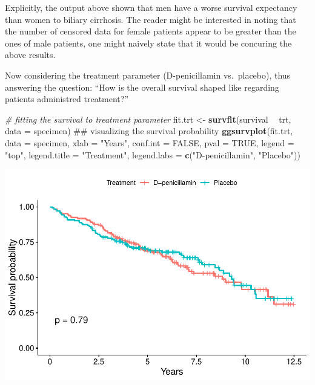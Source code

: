 \documentclass[]{article}
\newenvironment{Shaded}{\begin{snugshade}}{\end{snugshade}}
\newcommand{\KeywordTok}[1]{\textcolor[rgb]{0.13,0.29,0.53}{\textbf{#1}}}
\newcommand{\DataTypeTok}[1]{\textcolor[rgb]{0.13,0.29,0.53}{#1}}
\newcommand{\StringTok}[1]{\textcolor[rgb]{0.31,0.60,0.02}{#1}}
\newcommand{\CommentTok}[1]{\textcolor[rgb]{0.56,0.35,0.01}{\textit{#1}}}
\newcommand{\OtherTok}[1]{\textcolor[rgb]{0.56,0.35,0.01}{#1}}
\newcommand{\OperatorTok}[1]{\textcolor[rgb]{0.81,0.36,0.00}{\textbf{#1}}}
\newcommand{\NormalTok}[1]{#1}
\begin{document}
Explicitly, the output above shown that men have a worse survival
expectancy than women to biliary cirrhosis. The reader might be
interested in noting that the number of censored data for female
patients appear to be greater than the ones of male patients, one might
naively state that it would be concuring the above results.

Now considering the treatment parameter (D-penicillamin vs.~placebo),
thus answering the question: ``How is the overall survival shaped like
regarding patients administred treatment?''

\begin{Shaded}
\begin{Highlighting}[]
\CommentTok{# fitting the survival to treatment parameter}
\NormalTok{fit.trt <-}\StringTok{ }\KeywordTok{survfit}\NormalTok{(survival }\OperatorTok{~}\StringTok{ }\NormalTok{trt, }\DataTypeTok{data =}\NormalTok{ specimen)}
\NormalTok{## visualizing the survival probability}
\KeywordTok{ggsurvplot}\NormalTok{(fit.trt, }
           \DataTypeTok{data =}\NormalTok{ specimen, }
           \DataTypeTok{xlab =} \StringTok{"Years"}\NormalTok{,}
           \DataTypeTok{conf.int =} \OtherTok{FALSE}\NormalTok{,}
           \DataTypeTok{pval =} \OtherTok{TRUE}\NormalTok{,}
           \DataTypeTok{legend =} \StringTok{"top"}\NormalTok{,}
           \DataTypeTok{legend.title =} \StringTok{"Treatment"}\NormalTok{,}
           \DataTypeTok{legend.labs =} \KeywordTok{c}\NormalTok{(}\StringTok{"D-penicillamin"}\NormalTok{, }\StringTok{"Placebo"}\NormalTok{))}
\end{Highlighting}
\end{Shaded}

\includegraphics{report_files/figure-latex/unnamed-chunk-11-1.pdf}
\end{document}
